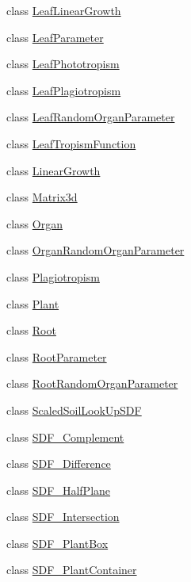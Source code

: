 \begin{DoxyCompactItemize}
class \hyperlink{classCPlantBox_1_1LeafLinearGrowth}{Leaf\+Linear\+Growth}
\item 
class \hyperlink{classCPlantBox_1_1LeafParameter}{Leaf\+Parameter}
\item 
class \hyperlink{classCPlantBox_1_1LeafPhototropism}{Leaf\+Phototropism}
\item 
class \hyperlink{classCPlantBox_1_1LeafPlagiotropism}{Leaf\+Plagiotropism}
\item 
class \hyperlink{classCPlantBox_1_1LeafRandomOrganParameter}{Leaf\+Random\+Organ\+Parameter}
\item 
class \hyperlink{classCPlantBox_1_1LeafTropismFunction}{Leaf\+Tropism\+Function}
\item 
class \hyperlink{classCPlantBox_1_1LinearGrowth}{Linear\+Growth}
\item 
class \hyperlink{classCPlantBox_1_1Matrix3d}{Matrix3d}
\item 
class \hyperlink{classCPlantBox_1_1Organ}{Organ}
\item 
class \hyperlink{classCPlantBox_1_1OrganRandomOrganParameter}{Organ\+Random\+Organ\+Parameter}
\item 
class \hyperlink{classCPlantBox_1_1Plagiotropism}{Plagiotropism}
\item 
class \hyperlink{classCPlantBox_1_1Plant}{Plant}
\item 
class \hyperlink{classCPlantBox_1_1Root}{Root}
\item 
class \hyperlink{classCPlantBox_1_1RootParameter}{Root\+Parameter}
\item 
class \hyperlink{classCPlantBox_1_1RootRandomOrganParameter}{Root\+Random\+Organ\+Parameter}
\item 
class \hyperlink{classCPlantBox_1_1ScaledSoilLookUpSDF}{Scaled\+Soil\+Look\+Up\+S\+DF}
\item 
class \hyperlink{classCPlantBox_1_1SDF__Complement}{S\+D\+F\+\_\+\+Complement}
\item 
class \hyperlink{classCPlantBox_1_1SDF__Difference}{S\+D\+F\+\_\+\+Difference}
\item 
class \hyperlink{classCPlantBox_1_1SDF__HalfPlane}{S\+D\+F\+\_\+\+Half\+Plane}
\item 
class \hyperlink{classCPlantBox_1_1SDF__Intersection}{S\+D\+F\+\_\+\+Intersection}
\item 
class \hyperlink{classCPlantBox_1_1SDF__PlantBox}{S\+D\+F\+\_\+\+Plant\+Box}
\item 
class \hyperlink{classCPlantBox_1_1SDF__PlantContainer}{S\+D\+F\+\_\+\+Plant\+Container}

\end{DoxyCompactItemize}

